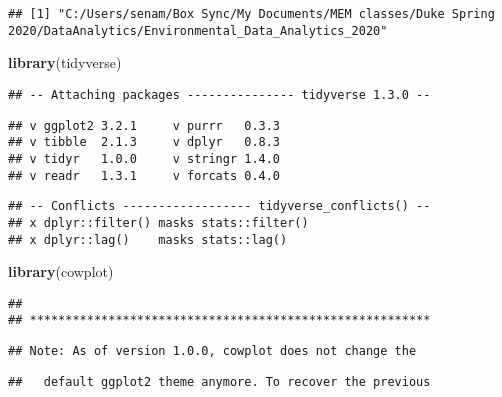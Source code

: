 \documentclass[
]{article}
\newenvironment{Shaded}{\begin{snugshade}}{\end{snugshade}}
\newcommand{\CommentTok}[1]{\textcolor[rgb]{0.56,0.35,0.01}{\textit{#1}}}
\newcommand{\KeywordTok}[1]{\textcolor[rgb]{0.13,0.29,0.53}{\textbf{#1}}}
\newcommand{\NormalTok}[1]{#1}
\begin{document}
\begin{Shaded}
\end{Shaded}

\begin{verbatim}
## [1] "C:/Users/senam/Box Sync/My Documents/MEM classes/Duke Spring 2020/DataAnalytics/Environmental_Data_Analytics_2020"
\end{verbatim}

\begin{Shaded}
\begin{Highlighting}[]
\KeywordTok{library}\NormalTok{(tidyverse)}
\end{Highlighting}
\end{Shaded}

\begin{verbatim}
## -- Attaching packages --------------- tidyverse 1.3.0 --
\end{verbatim}

\begin{verbatim}
## v ggplot2 3.2.1     v purrr   0.3.3
## v tibble  2.1.3     v dplyr   0.8.3
## v tidyr   1.0.0     v stringr 1.4.0
## v readr   1.3.1     v forcats 0.4.0
\end{verbatim}

\begin{verbatim}
## -- Conflicts ------------------ tidyverse_conflicts() --
## x dplyr::filter() masks stats::filter()
## x dplyr::lag()    masks stats::lag()
\end{verbatim}

\begin{Shaded}
\begin{Highlighting}[]
\KeywordTok{library}\NormalTok{(cowplot)}
\end{Highlighting}
\end{Shaded}

\begin{verbatim}
## 
## ********************************************************
\end{verbatim}

\begin{verbatim}
## Note: As of version 1.0.0, cowplot does not change the
\end{verbatim}

\begin{verbatim}
##   default ggplot2 theme anymore. To recover the previous
\end{verbatim}
\end{document}
